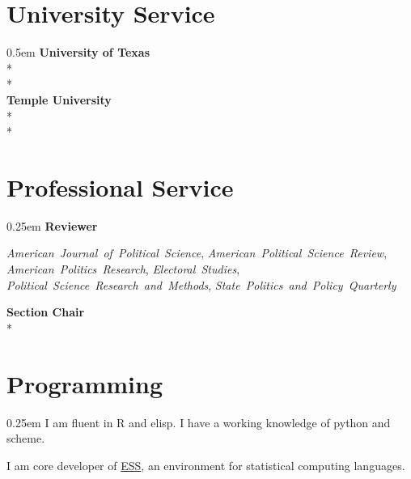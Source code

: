 \documentclass[article,11pt,oneside,letterpaper]{memoir}
\begin{document}
\section{University Service}{0.5em}
\textbf{University of Texas} \\*
 \\*
\\
\textbf{Temple University}\\*
 \\*
\\
\vspace{-1em}

\section{Professional Service}{0.25em}
\textbf{Reviewer}
\begin{adjustwidth}{\widthof{\hphantom{xyz}}}{}
  \begin{flushleft}
    \emph{American~Journal~of~Political~Science},
    \emph{American~Political~Science~Review},
    \emph{American~Politics~Research},
    \emph{Electoral~Studies},
    \emph{Political~Science~Research~and~Methods},
    \emph{State~Politics~and~Policy~Quarterly}
  \end{flushleft}
\end{adjustwidth}

\textbf{Section Chair}\\*

\section{Programming}{0.25em}
I am fluent in R and elisp. I have a working knowledge of python and scheme.

I am core developer of \href{https://ess.r-project.org}{ESS}, an environment for statistical computing languages.

\thispagestyle{lastpage}
\end{document}
